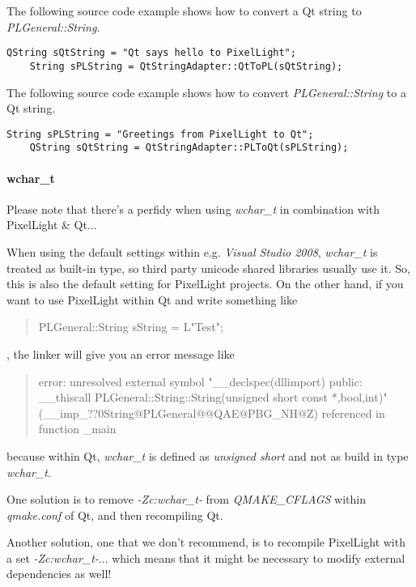 The following source code example shows how to convert a Qt string to \emph{PLGeneral::String}.
\begin{lstlisting}[caption=Qt string to PLGeneral::String]
	QString sQtString = "Qt says hello to PixelLight";
	String sPLString = QtStringAdapter::QtToPL(sQtString);
\end{lstlisting}

The following source code example shows how to convert \emph{PLGeneral::String} to a Qt string.
\begin{lstlisting}[caption=PLGeneral::String string to Qt]
	String sPLString = "Greetings from PixelLight to Qt";
	QString sQtString = QtStringAdapter::PLToQt(sPLString);
\end{lstlisting}


\paragraph{wchar\_t}
Please note that there's a perfidy when using \emph{wchar\_t} in combination with PixelLight \& Qt...

When using the default settings within e.g. \emph{Visual Studio 2008}, \emph{wchar\_t} is treated as built-in type, so third party unicode shared libraries usually use it. So, this is also the default setting for PixelLight projects. On the other hand, if you want to use PixelLight within Qt and write something like \begin{quote}PLGeneral::String sString = L"Test";\end{quote}, the linker will give you an error message like \begin{quote}error:  unresolved external symbol "\_\_declspec(dllimport) public: \_\_thiscall PLGeneral::String::String(unsigned short const *,bool,int)" (\_\_imp\_??0String@PLGeneral@@QAE@PBG\_NH@Z) referenced in function \_main\end{quote} because within Qt, \emph{wchar\_t} is defined as \emph{unsigned short} and not as build in type \emph{wchar\_t}.

One solution is to remove \emph{-Zc:wchar\_t-} from \emph{QMAKE\_CFLAGS} within \emph{qmake.conf} of Qt, and then recompiling Qt.

Another solution, one that we don't recommend, is to recompile PixelLight with a set \emph{-Zc:wchar\_t-}... which means that it might be necessary to modify external dependencies as well!
